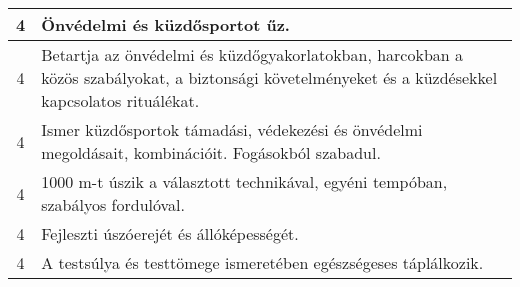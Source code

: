 \begin{longtable}{c | p{12cm} }
                                
                                          4 &  Önvédelmi és küzdősportot űz. \\ \hline
                                          4 &  Betartja az önvédelmi és küzdőgyakorlatokban, harcokban a közös szabályokat, a biztonsági követelményeket és a küzdésekkel kapcsolatos rituálékat. \\ \hline
                                          4 &  Ismer küzdősportok támadási, védekezési és önvédelmi megoldásait, kombinációit. Fogásokból szabadul. \\ \hline
                                          4 &  1000 m-t  úszik a választott technikával, egyéni tempóban, szabályos fordulóval. \\ \hline
                                          4 &  Fejleszti úszóerejét és állóképességét. \\ \hline
                                          4 &  A testsúlya és testtömege ismeretében egészségeses táplálkozik. \\ \hline
                                      
                        \end{longtable}
            \clearpage

